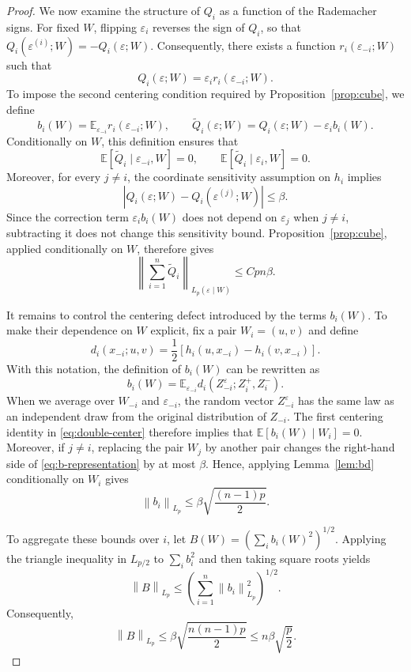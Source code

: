 \documentclass[10pt,a4paper]{amsart}
\newcommand{\E}{\mathbb{E}}
\newcommand{\abs}[1]{\left\lvert #1\right\rvert}
\newcommand{\norm}[1]{\left\lVert #1\right\rVert}
\begin{document}
\begin{proof}
We now examine the structure of $Q_i$ as a function of the Rademacher signs. For fixed $W$, flipping $\varepsilon_i$ reverses the sign of $Q_i$, so that $Q_i(\varepsilon^{(i)};W)=-Q_i(\varepsilon;W)$. Consequently, there exists a function $r_i(\varepsilon_{-i};W)$ such that
\[ Q_i(\varepsilon;W) = \varepsilon_i r_i(\varepsilon_{-i};W). \]
To impose the second centering condition required by Proposition~\ref{prop:cube}, we define
\[
b_i(W) = \E_{\varepsilon_{-i}} r_i(\varepsilon_{-i};W), \qquad \widetilde Q_i(\varepsilon;W) = Q_i(\varepsilon;W)-\varepsilon_i b_i(W).
\]
Conditionally on $W$, this definition ensures that
\[ \E[\widetilde Q_i\mid\varepsilon_{-i},W]=0, \qquad \E[\widetilde Q_i\mid\varepsilon_i,W]=0. \]
Moreover, for every $j\neq i$, the coordinate sensitivity assumption on $h_i$ implies
\[ \abs{Q_i(\varepsilon;W)-Q_i(\varepsilon^{(j)};W)} \le\beta.\]
Since the correction term $\varepsilon_i b_i(W)$ does not depend on $\varepsilon_j$ when $j\neq i$, subtracting it does not change this sensitivity bound. Proposition~\ref{prop:cube}, applied conditionally on $W$, therefore gives
\begin{equation}\label{eq:Qtilde}
\norm{\sum_{i=1}^n\widetilde Q_i}_{L_p(\varepsilon\mid W)} \le Cpn\beta.
\end{equation}

It remains to control the centering defect introduced by the terms $b_i(W)$. To make their dependence on $W$ explicit, fix a pair $W_i=(u,v)$ and define
\[
d_i(x_{-i};u,v)
=
\frac12
\left[
h_i(u,x_{-i})-h_i(v,x_{-i})
\right].
\]
With this notation, the definition of $b_i(W)$ can be rewritten as
\begin{equation}\label{eq:b-representation}
b_i(W)
=
\E_{\varepsilon_{-i}}
d_i(Z_{-i}^{\varepsilon};Z_i^+,Z_i^-).
\end{equation}
When we average over $W_{-i}$ and $\varepsilon_{-i}$, the random vector $Z_{-i}^{\varepsilon}$ has the same law as an independent draw from the original distribution of $Z_{-i}$. The first centering identity in \eqref{eq:double-center} therefore implies that $\E[b_i(W)\mid W_i]=0$. Moreover, if $j\neq i$, replacing the pair $W_j$ by another pair changes the right-hand side of \eqref{eq:b-representation} by at most $\beta$. Hence, applying Lemma~\ref{lem:bd} conditionally on $W_i$ gives
\[
\norm{b_i}_{L_p} \le \beta\sqrt{\frac{(n-1)p}{2}}.
\]

To aggregate these bounds over $i$, let \( B(W)=\left(\sum_i b_i(W)^2\right)^{1/2} \). Applying the triangle inequality in $L_{p/2}$ to $\sum_ib_i^2$ and then taking square roots yields
\[
\norm{B}_{L_p} \le \left(\sum_{i=1}^n\norm{b_i}_{L_p}^2\right)^{1/2}.
\]
Consequently,
\begin{equation}\label{eq:B-moment}
\norm{B}_{L_p} \le \beta\sqrt{\frac{n(n-1)p}{2}} \le n\beta\sqrt{\frac p2}.
\end{equation}


\end{proof}
\end{document}
